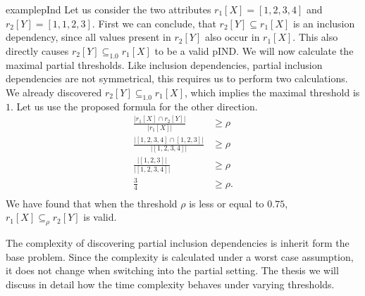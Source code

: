 \begin{restatable}{example}{pInd}\label{exmp:pInd}
    Let us consider the two attributes $r_1[X] = [1, 2, 3, 4]$ and $r_2[Y] = [1, 1, 2, 3]$. First we can conclude, that $r_2[Y] \subseteq r_1[X]$ is an inclusion dependency, since all values present in $r_2[Y]$ also occur in $r_1[X]$. This also directly causes $r_2[Y] \subseteq_{1.0} r_1[X]$ to be a valid pIND. We will now calculate the maximal partial thresholds. Like inclusion dependencies, partial inclusion dependencies are not symmetrical, this requires us to perform two calculations. We already discovered $r_2[Y] \subseteq_{1.0} r_1[X]$, which implies the maximal threshold is $1$. Let us use the proposed formula for the other direction.
    \begin{align*}
        \frac{|r_1[X] \cap r_2[Y]|}
            {|r_1[X]|} & \geq \rho \\
        \frac{|[1, 2, 3, 4] \cap [1, 2, 3]|}
            {|[1, 2, 3, 4]|} & \geq \rho \\ 
        \frac{|[1, 2, 3]|}
            {|[1, 2, 3, 4]|} & \geq \rho \\
        \frac{3}{4} & \geq \rho. \\ 
    \end{align*}
    We have found that when the threshold $\rho$ is less or equal to $0.75$, $r_1[X] \subseteq_{\rho} r_2[Y]$ is valid.
\end{restatable}

The complexity of discovering partial inclusion dependencies is inherit form the base problem. Since the complexity is calculated under a worst case assumption, it does not change when switching into the partial setting. The thesis we will discuss in detail how the time complexity behaves under varying thresholds.

